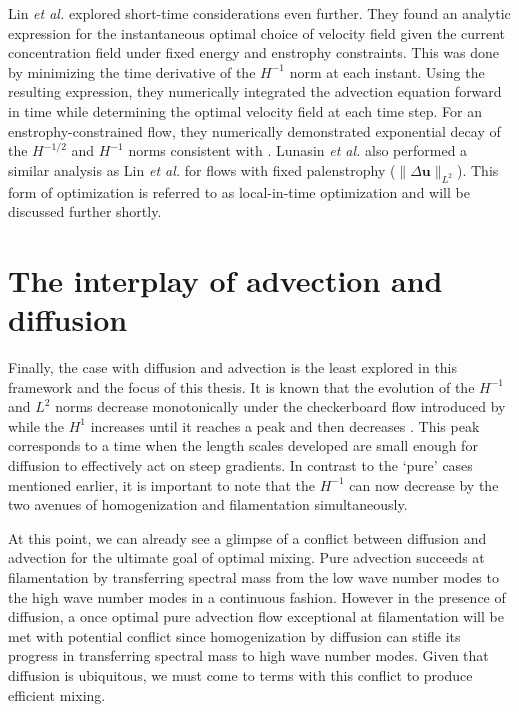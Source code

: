  Lin {\it et al.} \cite{JFM2011} explored short-time considerations even further. They found an analytic expression for the instantaneous optimal choice of velocity field given the current concentration field under fixed energy and enstrophy constraints. This was done by minimizing the time derivative of the $H^{-1}$ norm at each instant. Using the resulting expression, they numerically integrated the advection equation forward in time while determining the optimal velocity field at each time step. For an enstrophy-constrained flow, they numerically demonstrated exponential decay of the $H^{-1/2}$ and $H^{-1}$ norms consistent with \cite{CS2013,GI2014,Alberti2014a,Mathew2007b}. Lunasin {\it et al.} \cite{JMP2012} also performed a similar analysis as Lin {\it et al.} for flows with fixed palenstrophy ($\|\Delta\mathbf{u}\|_{L^{2}}$). This form of optimization is referred to as local-in-time optimization and will be discussed further shortly.


\section{The interplay of advection and diffusion}

Finally, the case with diffusion and advection is the least explored in this framework and the focus of this thesis. It is known that the evolution of the $H^{-1}$ and $L^2$ norms decrease monotonically under the checkerboard flow introduced by \cite{JMP2012}
 while the $H^{1}$ increases until it reaches a peak and then decreases \cite{DF2014}. This peak corresponds to a  time when the length scales developed are small enough for diffusion to effectively act on steep gradients. In contrast to the `pure' cases mentioned earlier, it is important to note that the $H^{-1}$ can now decrease by the two avenues of homogenization and filamentation simultaneously. 

At this point, we can already see a glimpse of a conflict between diffusion and advection for the ultimate goal of optimal mixing. Pure advection succeeds at filamentation by transferring spectral mass from the low wave number modes to the high wave number modes in a continuous fashion. However in the presence of diffusion, a once optimal pure advection flow exceptional at filamentation will be met with potential conflict since homogenization by diffusion can stifle its progress in transferring spectral mass to high wave number modes. Given that diffusion is ubiquitous, we must come to terms with this conflict to produce efficient mixing.


